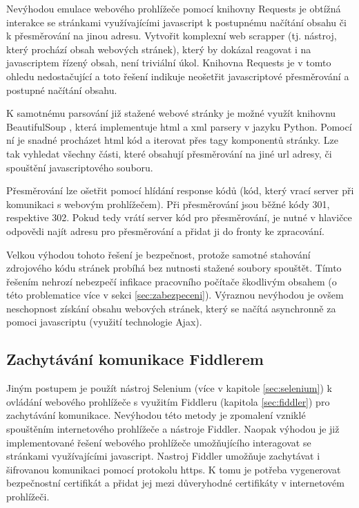 \documentclass[thesis=M,czech,hidelinks]{FITthesis}[2013/05/06]
\begin{document}
Nevýhodou emulace webového prohlížeče pomocí knihovny Requests je obtížná interakce se stránkami využívajícími javascript k postupnému načítání obsahu či k přesměrování na jinou adresu. Vytvořit komplexní web scrapper (tj. nástroj, který prochází obsah webových stránek), který by dokázal reagovat i na javascriptem řízený obsah, není triviální úkol.  Knihovna Requests je v tomto ohledu nedostačující a toto řešení indikuje neošetřit javascriptové přesměrování a postupné načítání obsahu.

K samotnému parsování již stažené webové stránky je možné využít knihovnu BeautifulSoup \cite{beautifulsoup}, která implementuje html a xml parsery v jazyku Python. Pomocí ní je snadné procházet html kód a iterovat přes tagy komponentů stránky. Lze tak vyhledat všechny části, které obsahují přesměrování na jiné url adresy, či spouštění javascriptového souboru. 

Přesměrování lze ošetřit pomocí hlídání response kódů (kód, který vrací server při komunikaci s webovým prohlížečem). Při přesměrování jsou běžné kódy 301, respektive 302. Pokud tedy vrátí server kód pro přesměrování, je nutné v hlavičce odpovědi najít adresu pro přesměrování a přidat ji do fronty ke zpracování.

Velkou výhodou tohoto řešení je bezpečnost, protože samotné stahování zdrojového kódu stránek probíhá bez nutnosti stažené soubory spouštět. Tímto řešením nehrozí nebezpečí infikace pracovního počítače škodlivým obsahem (o této problematice více v sekci \ref{sec:zabezpeceni}). Výraznou nevýhodou je ovšem neschopnost získání obsahu webových stránek, který se načítá asynchronně za pomoci javascriptu (využití technologie Ajax).

\subsection{Zachytávání komunikace Fiddlerem}
Jiným postupem je použít nástroj Selenium (více v kapitole \ref{sec:selenium}) k ovládání webového prohlížeče s využitím Fiddleru (kapitola \ref{sec:fiddler}) pro zachytávání komunikace. Nevýhodou této metody je zpomalení vzniklé spouštěním internetového prohlížeče a nástroje Fiddler. Naopak výhodou je již implementované řešení webového prohlížeče umožňujícího interagovat se stránkami využívajícími javascript. Nastroj Fiddler umožňuje zachytávat i šifrovanou komunikaci pomocí protokolu https. K tomu je potřeba vygenerovat bezpečnostní certifikát a přidat jej mezi důveryhodné certifikáty v internetovém prohlížeči.
\end{document}
